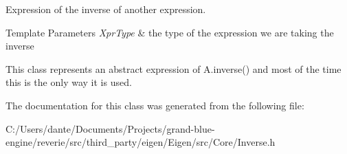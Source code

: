 Expression of the inverse of another expression. 


\begin{DoxyTemplParams}{Template Parameters}
{\em Xpr\+Type} & the type of the expression we are taking the inverse\\
\hline
\end{DoxyTemplParams}
This class represents an abstract expression of A.\+inverse() and most of the time this is the only way it is used. 

The documentation for this class was generated from the following file\+:\begin{DoxyCompactItemize}
\item 
C\+:/\+Users/dante/\+Documents/\+Projects/grand-\/blue-\/engine/reverie/src/third\+\_\+party/eigen/\+Eigen/src/\+Core/Inverse.\+h\end{DoxyCompactItemize}
